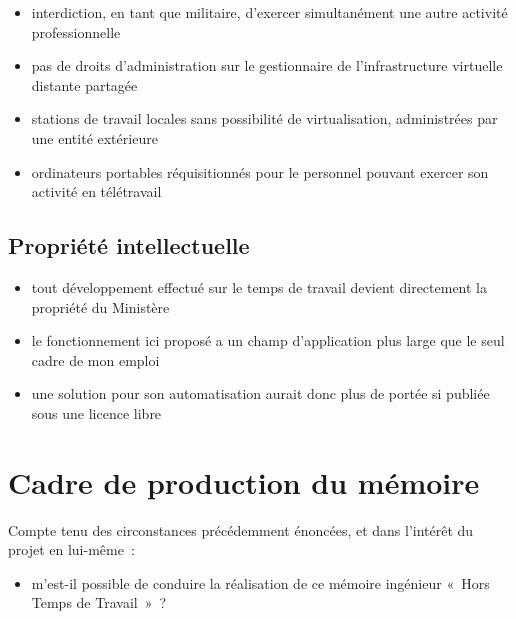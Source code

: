 \documentclass[10pt]{article}
\newenvironment{itmz}{\begin{itemize}
\setlength{\itemsep}{0em}
}{\end{itemize}}
\begin{document}
\begin{itmz}
\item{interdiction, en tant que militaire, d’exercer simultanément une autre activité professionnelle}
\item{pas de droits d’administration sur le gestionnaire de l’infrastructure virtuelle distante partagée}
\item{stations de travail locales sans possibilité de virtualisation, administrées par une entité extérieure}
\item{ordinateurs portables réquisitionnés pour le personnel pouvant exercer son activité en télétravail}
\end{itmz}

\subsection{Propriété intellectuelle}

\begin{itmz}
\item{tout développement effectué sur le temps de travail devient directement la propriété du Ministère}
\item{le fonctionnement ici proposé a un champ d’application plus large que le seul cadre de mon emploi}
\item{une solution pour son automatisation aurait donc plus de portée si publiée sous une licence libre}
\end{itmz}

\section{Cadre de production du mémoire}

Compte tenu des circonstances précédemment énoncées, et dans l’intérêt du projet en lui-même :
\begin{itmz}
\item{m’est-il possible de conduire la réalisation de ce mémoire ingénieur « Hors Temps de Travail » ?}
\end{itmz}
\end{document}

